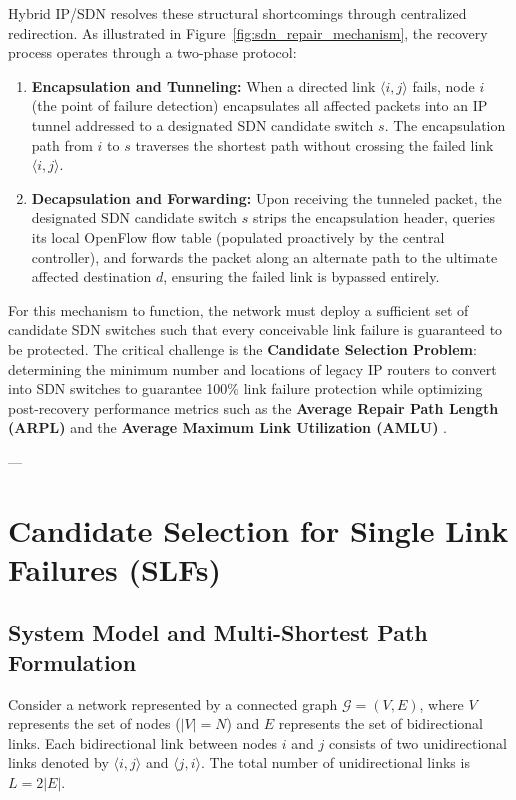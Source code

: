 Hybrid IP/SDN resolves these structural shortcomings through centralized redirection. As illustrated in Figure~\ref{fig:sdn_repair_mechanism}, the recovery process operates through a two-phase protocol:
\begin{enumerate}
    \item \textbf{Encapsulation and Tunneling:} When a directed link $\langle i, j \rangle$ fails, node $i$ (the point of failure detection) encapsulates all affected packets into an IP tunnel addressed to a designated SDN candidate switch $s$. The encapsulation path from $i$ to $s$ traverses the shortest path without crossing the failed link $\langle i, j \rangle$.
    \item \textbf{Decapsulation and Forwarding:} Upon receiving the tunneled packet, the designated SDN candidate switch $s$ strips the encapsulation header, queries its local OpenFlow flow table (populated proactively by the central controller), and forwards the packet along an alternate path to the ultimate affected destination $d$, ensuring the failed link is bypassed entirely.
\end{enumerate}

For this mechanism to function, the network must deploy a sufficient set of candidate SDN switches such that every conceivable link failure is guaranteed to be protected. The critical challenge is the \textbf{Candidate Selection Problem}: determining the minimum number and locations of legacy IP routers to convert into SDN switches to guarantee 100\% link failure protection while optimizing post-recovery performance metrics such as the \textbf{Average Repair Path Length (ARPL)} and the \textbf{Average Maximum Link Utilization (AMLU)} \cite{vuppalapati2022minimum}.

---

\section{Candidate Selection for Single Link Failures (SLFs)}
\label{sec:sdn_slf}

\subsection{System Model and Multi-Shortest Path Formulation}
Consider a network represented by a connected graph $\mathcal{G} = (V, E)$, where $V$ represents the set of nodes ($|V| = N$) and $E$ represents the set of bidirectional links. Each bidirectional link between nodes $i$ and $j$ consists of two unidirectional links denoted by $\langle i, j \rangle$ and $\langle j, i \rangle$. The total number of unidirectional links is $L = 2|E|$.

